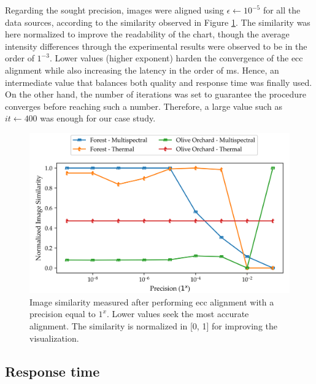 Regarding the sought precision, images were aligned using $\epsilon \gets 10^{-5}$ for all the data sources, according to the similarity observed in Figure \ref{fig:ecc_precision}. The similarity was here normalized to improve the readability of the chart, though the average intensity differences through the experimental results were observed to be in the order of $1^{-3}$. Lower values (higher exponent) harden the convergence of the \acrshort{ecc} alignment while also increasing the latency in the order of \si{\milli\second}. Hence, an intermediate value that balances both quality and response time was finally used. On the other hand, the number of iterations was set to guarantee the procedure converges before reaching such a number. Therefore, a large value such as $\textit{it} \gets 400$ was enough for our case study.

\begin{figure}[ht]
    \centering
    \includegraphics[width=\linewidth]{figs/multi_thermal_projection/results/ecc_precision.png}
    \caption{Image similarity measured after performing \acrshort{ecc} alignment with a precision equal to $1^x$. Lower values seek the most accurate alignment. The similarity is normalized in [0, 1] for improving the visualization. }
    \label{fig:ecc_precision}
\end{figure}

\subsection{Response time}

